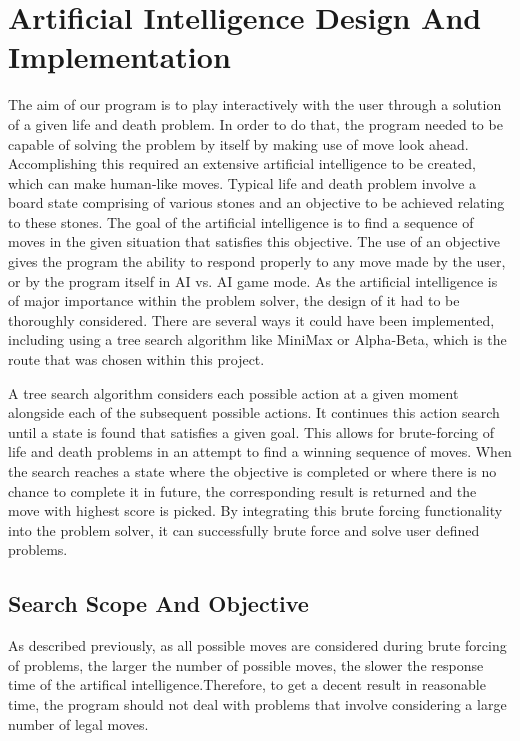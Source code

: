 \documentclass{l3proj}
\begin{document}
\section{Artificial Intelligence Design And Implementation}

The aim of our program is to play interactively with the user through a solution of a given life and death problem. In order to do that, the program needed to be capable of solving the problem by itself by making use of move look ahead. Accomplishing this required an extensive artificial intelligence to be created, which can make human-like moves. Typical life and death problem involve a board state comprising of various stones and an objective to be achieved relating to these stones. The goal of the artificial intelligence is to find a sequence of moves in the given situation that satisfies this objective. The use of an objective gives the program the ability to respond properly to any move made by the user, or by the program itself in AI vs. AI game mode. As the artificial intelligence is of major importance within the problem solver, the design of it had to be thoroughly considered. There are several ways it could have been implemented, including using a tree search algorithm like MiniMax or Alpha-Beta, which is the route that was chosen within this project.
 
A tree search algorithm considers each possible action at a given moment alongside each of the subsequent possible actions. It continues this action search until a state is found that satisfies a given goal. This allows for brute-forcing of life and death problems in an attempt to find a winning sequence of moves. When the search reaches a state where the objective is completed or where there is no chance to complete it in future, the corresponding result is returned and the move with highest score is picked. By integrating this brute forcing functionality into the problem solver, it can successfully brute force and solve user defined problems.

\subsection{Search Scope And Objective}

As described previously, as all possible moves are considered during brute forcing of problems, the larger the number of possible moves, the slower the response time of the artifical intelligence.Therefore, to get a decent result in reasonable time, the program should not deal with problems that involve considering a large number of legal moves.
\end{document}
